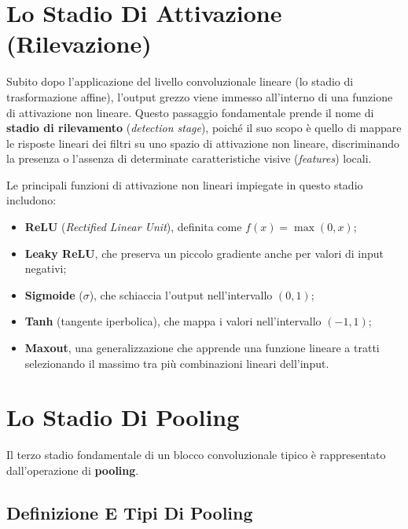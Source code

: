 ﻿\documentclass[11pt, a4paper]{article}
\begin{document}
\newpage

\section{Lo Stadio Di Attivazione (Rilevazione)}

Subito dopo l'applicazione del livello convoluzionale lineare (lo stadio di trasformazione affine), l'output grezzo viene immesso all'interno di una funzione di attivazione non lineare. Questo passaggio fondamentale prende il nome di \textbf{stadio di rilevamento} (\emph{detection stage}), poiché il suo scopo è quello di mappare le risposte lineari dei filtri su uno spazio di attivazione non lineare, discriminando la presenza o l'assenza di determinate caratteristiche visive (\emph{features}) locali.

Le principali funzioni di attivazione non lineari impiegate in questo stadio includono:
\begin{itemize}
    \item \textbf{ReLU} (\emph{Rectified Linear Unit}), definita come $f(x) = \max(0, x)$;
    \item \textbf{Leaky ReLU}, che preserva un piccolo gradiente anche per valori di input negativi;
    \item \textbf{Sigmoide} ($\sigma$), che schiaccia l'output nell'intervallo $(0, 1)$;
    \item \textbf{Tanh} (tangente iperbolica), che mappa i valori nell'intervallo $(-1, 1)$;
    \item \textbf{Maxout}, una generalizzazione che apprende una funzione lineare a tratti selezionando il massimo tra più combinazioni lineari dell'input.
\end{itemize}

\newpage

\section{Lo Stadio Di Pooling}

Il terzo stadio fondamentale di un blocco convoluzionale tipico è rappresentato dall'operazione di \textbf{pooling}.

\subsection{Definizione E Tipi Di Pooling}
\end{document}
